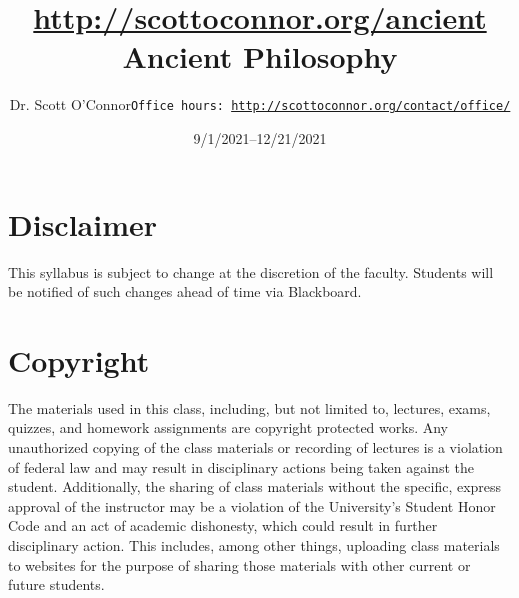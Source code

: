\documentclass[article,oneside]{memoir}
\def\myauthor{Author}
\def\mytitle{Title}
\def\mycopyright{\myauthor}
\def\myweb{\href{http://scottoconnor.org/ancient}{http://scottoconnor.org/ancient}}
\def\myauthor{Dr. Scott O'Connor}
\def\mytitle{{\normalsize \myweb \newline} \HUGE Ancient Philosophy}
\begin{document}
\setsansfont[Mapping=tex-text]{Myriad Pro} 
\setmonofont[Mapping=tex-text,Scale=0.8]{Georgia} 

\def\ind{\hangindent=1 true cm\hangafter=1 \noindent}
\def\labelitemi{$\cdot$}


\title{\LARGE \mytitle}     
\author{\Large\myauthor \newline \footnotesize\texttt{\noindent Office hours: \href{http://scottoconnor.org/contact/office/}{http://scottoconnor.org/contact/office/}}}
\date{9/1/2021--12/21/2021}



\maketitle




%
%


\section{Disclaimer}
 This syllabus is subject to change at the discretion of the faculty. Students will be notified of such changes ahead of time via Blackboard. 


\section{Copyright}
The materials used in this class, including, but not limited to, lectures, exams, quizzes, and homework assignments are copyright protected works.  Any unauthorized copying of the class materials or recording of lectures is a violation of federal law and may result in disciplinary actions being taken against the student.  Additionally, the sharing of class materials without the specific, express approval of the instructor may be a violation of the University's Student Honor Code and an act of academic dishonesty, which could result in further disciplinary action.  This includes, among other things, uploading class materials to websites for the purpose of sharing those materials with other current or future students. 
\end{document}
